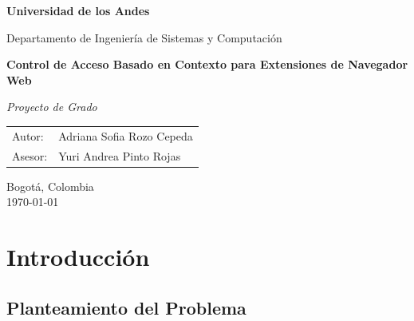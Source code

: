\documentclass[12pt,oneside]{report}
\begin{document}
\begin{titlepage}
\centering
\setlength{\parindent}{0pt}

\vspace{0.9cm}
{\Large \textbf{Universidad de los Andes}\par}
{\large Departamento de Ingeniería de Sistemas y Computación\par}

\vspace{2.6cm}
{\bfseries\LARGE Control de Acceso Basado en Contexto para Extensiones de Navegador Web\par}
\vspace{0.45cm}
{\large \textit{Proyecto de Grado}\par}

\vspace{9.6cm}
\begin{flushleft}
\renewcommand{\arraystretch}{1.35}
\begin{tabular}{@{}l l@{}}
Autor: & Adriana Sofia Rozo Cepeda \\
Asesor: & Yuri Andrea Pinto Rojas\\
\end{tabular}
\end{flushleft}

\vfill
\begin{flushleft}
Bogotá, Colombia\\
\today
\end{flushleft}

\restoregeometry
\end{titlepage}
\tableofcontents
\clearpage %



\chapter{Introducción}

\section{Planteamiento del Problema}
\label{sec:problema}
\end{document}
